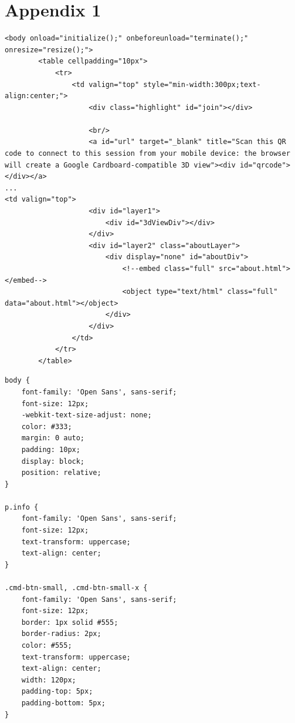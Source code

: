 \documentclass[letterpaper, 10pt, draftclsnofoot, compsoc, onecolumn]{IEEEtran}
\begin{document}
\section{Appendix 1}
\begin{lstlisting}[caption=Site layout: HTML iframe table skeleton and Viewer]
<body onload="initialize();" onbeforeunload="terminate();" onresize="resize();">
        <table cellpadding="10px">
            <tr>
                <td valign="top" style="min-width:300px;text-align:center;">
                    <div class="highlight" id="join"></div>

                    <br/>
                    <a id="url" target="_blank" title="Scan this QR code to connect to this session from your mobile device: the browser will create a Google Cardboard-compatible 3D view"><div id="qrcode"></div></a>
...
<td valign="top">
                    <div id="layer1">
                        <div id="3dViewDiv"></div>
                    </div>
                    <div id="layer2" class="aboutLayer">
                        <div display="none" id="aboutDiv">
                            <!--embed class="full" src="about.html"></embed-->
                            <object type="text/html" class="full" data="about.html"></object>
                        </div>
                    </div>
                </td>
            </tr>
        </table>
\end{lstlisting}
\medskip
\begin{lstlisting}[caption=Site layout: CSS for side panel and main page]
body {
    font-family: 'Open Sans', sans-serif;
    font-size: 12px;
    -webkit-text-size-adjust: none;
    color: #333;
    margin: 0 auto;
    padding: 10px;
    display: block;
    position: relative;
}

p.info {
    font-family: 'Open Sans', sans-serif;
    font-size: 12px;
    text-transform: uppercase;
    text-align: center;
}

.cmd-btn-small, .cmd-btn-small-x {
    font-family: 'Open Sans', sans-serif;
    font-size: 12px;
    border: 1px solid #555;
    border-radius: 2px;
    color: #555;
    text-transform: uppercase;
    text-align: center;
    width: 120px;
    padding-top: 5px;
    padding-bottom: 5px;
}
\end{lstlisting}

\medskip
\end{document}

